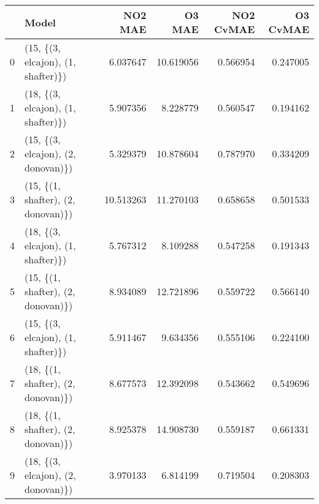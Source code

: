 \begin{tabular}{llrrrr}
\toprule
{} &                               Model &    NO2 MAE &     O3 MAE &  NO2 CvMAE &  O3 CvMAE \\
\midrule
0 &  (15, \{(3, elcajon), (1, shafter)\}) &   6.037647 &  10.619056 &   0.566954 &  0.247005 \\
1 &  (18, \{(3, elcajon), (1, shafter)\}) &   5.907356 &   8.228779 &   0.560547 &  0.194162 \\
2 &  (15, \{(3, elcajon), (2, donovan)\}) &   5.329379 &  10.878604 &   0.787970 &  0.334209 \\
3 &  (15, \{(1, shafter), (2, donovan)\}) &  10.513263 &  11.270103 &   0.658658 &  0.501533 \\
4 &  (18, \{(3, elcajon), (1, shafter)\}) &   5.767312 &   8.109288 &   0.547258 &  0.191343 \\
5 &  (15, \{(1, shafter), (2, donovan)\}) &   8.934089 &  12.721896 &   0.559722 &  0.566140 \\
6 &  (15, \{(3, elcajon), (1, shafter)\}) &   5.911467 &   9.634356 &   0.555106 &  0.224100 \\
7 &  (18, \{(1, shafter), (2, donovan)\}) &   8.677573 &  12.392098 &   0.543662 &  0.549696 \\
8 &  (18, \{(1, shafter), (2, donovan)\}) &   8.925378 &  14.908730 &   0.559187 &  0.661331 \\
9 &  (18, \{(3, elcajon), (2, donovan)\}) &   3.970133 &   6.814199 &   0.719504 &  0.208303 \\
\bottomrule
\end{tabular}
